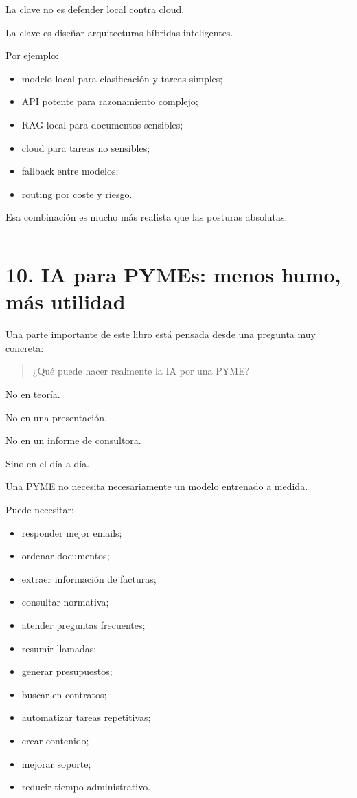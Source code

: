 La clave no es defender local contra cloud.

La clave es diseñar arquitecturas híbridas inteligentes.

Por ejemplo:

\begin{itemize}
\tightlist
\item
  modelo local para clasificación y tareas simples;
\item
  API potente para razonamiento complejo;
\item
  RAG local para documentos sensibles;
\item
  cloud para tareas no sensibles;
\item
  fallback entre modelos;
\item
  routing por coste y riesgo.
\end{itemize}

Esa combinación es mucho más realista que las posturas absolutas.

\begin{center}\rule{0.5\linewidth}{0.5pt}\end{center}

\section{10. IA para PYMEs: menos humo, más
utilidad}\label{ia-para-pymes-menos-humo-muxe1s-utilidad}

Una parte importante de este libro está pensada desde una pregunta muy
concreta:

\begin{quote}
¿Qué puede hacer realmente la IA por una PYME?
\end{quote}

No en teoría.

No en una presentación.

No en un informe de consultora.

Sino en el día a día.

Una PYME no necesita necesariamente un modelo entrenado a medida.

Puede necesitar:

\begin{itemize}
\tightlist
\item
  responder mejor emails;
\item
  ordenar documentos;
\item
  extraer información de facturas;
\item
  consultar normativa;
\item
  atender preguntas frecuentes;
\item
  resumir llamadas;
\item
  generar presupuestos;
\item
  buscar en contratos;
\item
  automatizar tareas repetitivas;
\item
  crear contenido;
\item
  mejorar soporte;
\item
  reducir tiempo administrativo.
\end{itemize}

